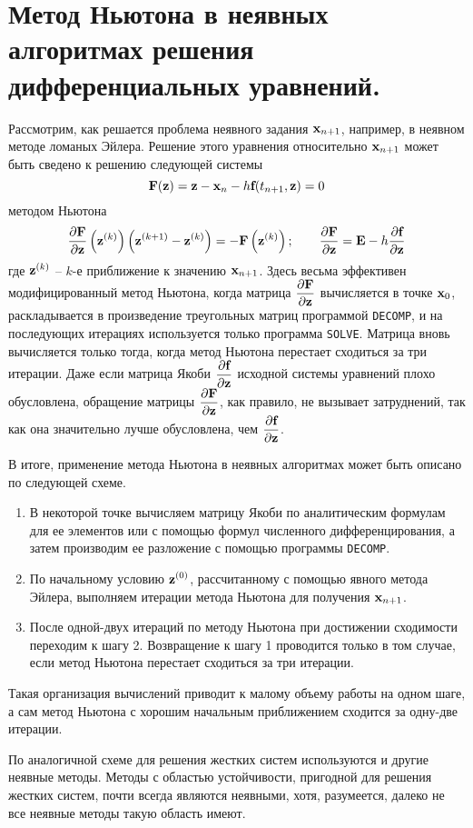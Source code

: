 \section{Метод Ньютона в неявных алгоритмах решения дифференциальных уравнений.}\label{sec:ch28}
Рассмотрим, как решается проблема неявного задания $\bf{x}_{n+1}$, например, в неявном методе ломаных Эйлера. Решение
этого уравнения относительно $\bf{x}_{n+1}$ может быть сведено к решению следующей системы
\begin{equation}
    \bf{F}(\bf{z}) = \bf{z} - \bf{x}_n - h\bf{f}(t_{n+1}, \bf{z}) = 0 \label{eq:hard6}
\end{equation}
методом Ньютона
\begin{equation*}
    \frac{\partial \bf{F}}{\partial \bf{z}}\left( \bf{z}^{(k)} \right)\left( \bf{z}^{(k+1)} - \bf{z}^{(k)} \right) = -\bf{F}\left( \bf{z}^{(k)} \right); \qquad
    \frac{\partial \bf{F}}{\partial \bf{z}} = \bf{E} - h \frac{\partial \bf{f}}{\partial \bf{z}}
\end{equation*}
где $\bf{z}^{(k)}$ -- $k$-е приближение к значению $\bf{x}_{n+1}$. Здесь весьма эффективен модифицированный метод Ньютона,
когда матрица $\displaystyle \frac{\partial \bf{F}}{\partial \bf{z}}$ вычисляется в точке $\bf{x}_0$, раскладывается в произведение
треугольных матриц программой \verb|DECOMP|, и на последующих итерациях используется только программа \verb|SOLVE|.
Матрица вновь вычисляется только тогда, когда метод Ньютона перестает сходиться за три итерации. Даже если матрица Якоби
$\displaystyle \frac{\partial \bf{f}}{\partial \bf{z}}$ исходной системы уравнений плохо обусловлена, обращение матрицы
$\displaystyle \frac{\partial \bf{F}}{\partial \bf{z}}$, как правило, не вызывает затруднений, так как она значительно
лучше обусловлена, чем $\displaystyle \frac{\partial \bf{f}}{\partial \bf{z}}$.

В итоге, применение метода Ньютона в неявных алгоритмах может быть описано по следующей схеме.
\begin{enumerate}
    \item В некоторой точке вычисляем матрицу Якоби по аналитическим формулам для ее элементов или с помощью формул
    численного дифференцирования, а затем производим ее разложение с помощью программы \verb|DECOMP|.

    \item По начальному условию $\displaystyle \bf{z}^{(0)}$, рассчитанному с помощью явного метода Эйлера,
    выполняем итерации метода Ньютона для получения $\displaystyle \bf{x}_{n+1}$.

    \item После одной-двух итераций по методу Ньютона при достижении сходимости переходим к шагу 2. Возвращение к
    шагу 1 проводится только в том случае, если метод Ньютона перестает сходиться за три итерации.
\end{enumerate}
Такая организация вычислений приводит к малому объему работы на одном шаге, а сам метод Ньютона с хорошим начальным
приближением сходится за одну-две итерации.

По аналогичной схеме для решения жестких систем используются и другие неявные методы. Методы с областью устойчивости,
пригодной для решения жестких систем, почти всегда являются неявными, хотя, разумеется, далеко не все неявные методы
такую область имеют.
